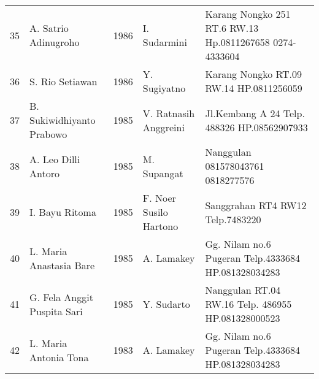 \documentclass[a5paper,titlepage,11pt]{book}
\begin{document}
\begin{tabular}{|r|p{2.75cm}|p{0.75cm}|p{2.75cm}|p{3cm}|}
35&A. Satrio Adinugroho&1986&I. Sudarmini&Karang Nongko 251 RT.6 RW.13 Hp.0811267658 0274-4333604\\
36&S. Rio Setiawan&1986&Y. Sugiyatno&Karang Nongko RT.09 RW.14 HP.0811256059\\
37&B. Sukiwidhiyanto Prabowo&1985&V. Ratnasih Anggreini&Jl.Kembang A 24 Telp. 488326 HP.08562907933\\
38&A. Leo Dilli Antoro&1985&M. Supangat&Nanggulan 081578043761 0818277576\\
39&I. Bayu Ritoma&1985&F. Noer Susilo Hartono&Sanggrahan  RT4 RW12 Telp.7483220\\
40&L. Maria Anastasia Bare &1985&A. Lamakey&Gg. Nilam no.6 Pugeran Telp.4333684 HP.081328034283\\
41&G. Fela Anggit Puspita Sari&1985&Y. Sudarto&Nanggulan RT.04 RW.16 Telp. 486955 HP.081328000523\\
42&L. Maria Antonia Tona&1983&A. Lamakey&Gg. Nilam no.6 Pugeran Telp.4333684 HP.081328034283\\ \hline
\end{tabular}
\normalsize%
\end{document}
